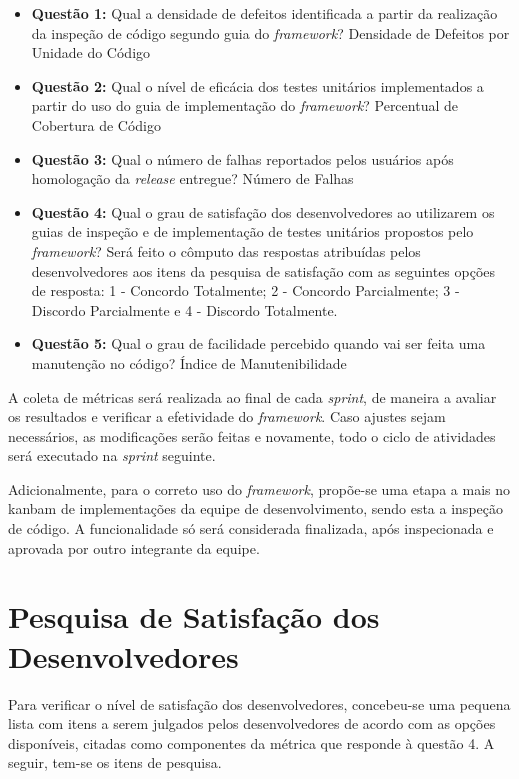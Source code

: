 \begin{itemize}
	\item \textbf{Questão 1:} Qual a densidade de defeitos identificada a partir da realização da inspeção de código segundo guia do \textit{framework}?
	\subitem Densidade de Defeitos por Unidade do Código

	\item \textbf{Questão 2:} Qual o nível de eficácia dos testes unitários implementados a partir do uso do guia de implementação do \textit{framework}?
	\subitem Percentual de Cobertura de Código

	\item \textbf{Questão 3:} Qual o número de falhas reportados pelos usuários após homologação da \textit{release} entregue?
	\subitem Número de Falhas

	\item \textbf{Questão 4:} Qual o grau de satisfação dos desenvolvedores ao utilizarem os guias de inspeção e de implementação de testes unitários propostos pelo \textit{framework}?
	\subitem Será feito o cômputo das respostas atribuídas pelos desenvolvedores aos itens da pesquisa de satisfação com as seguintes opções de resposta: 1 - Concordo Totalmente; 2 - Concordo Parcialmente; 3 - Discordo Parcialmente e 4 - Discordo Totalmente.

	\item \textbf{Questão 5:} Qual o grau de facilidade percebido quando vai ser feita uma manutenção no código?
	\subitem Índice de Manutenibilidade
\end{itemize}

A coleta de métricas será realizada ao final de cada \textit{sprint}, de maneira a avaliar os resultados e verificar a efetividade do \textit{framework}. Caso ajustes sejam necessários, as modificações serão feitas e novamente, todo o ciclo de atividades será executado na \textit{sprint} seguinte.

Adicionalmente, para o correto uso do \textit{framework}, propõe-se uma etapa a mais no kanbam de implementações da equipe de desenvolvimento, sendo esta a inspeção de código. A funcionalidade só será considerada finalizada, após inspecionada e aprovada por outro integrante da equipe.

\section{Pesquisa de Satisfação dos Desenvolvedores}

Para verificar o nível de satisfação dos desenvolvedores, concebeu-se uma pequena lista com itens a serem julgados pelos desenvolvedores de acordo com as opções disponíveis, citadas como componentes da métrica que responde à questão 4. A seguir, tem-se os itens de pesquisa.

